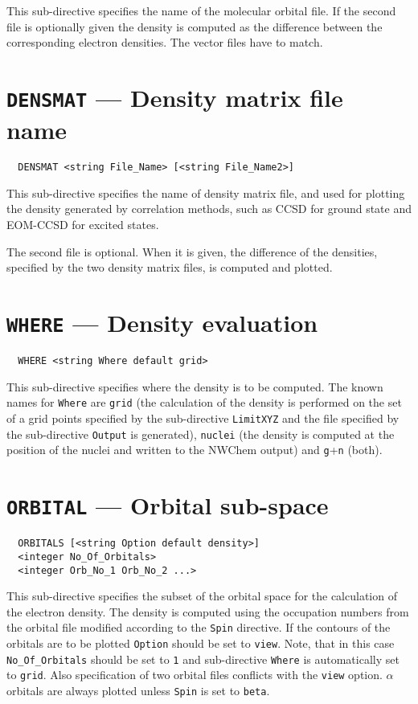 This sub-directive specifies the name of the molecular orbital file.
If the second file is optionally given the density is computed as the
difference between the corresponding electron densities. The vector 
files have to match.

\section{{\tt DENSMAT} ---  Density matrix file name}

\begin{verbatim}
  DENSMAT <string File_Name> [<string File_Name2>]
\end{verbatim}

This sub-directive specifies the name of density matrix file,
and used for plotting the density generated by correlation methods,
such as CCSD for ground state and EOM-CCSD for excited states.

The second file is optional. When it is given, 
the difference of the densities, specified by the two density matrix files,
is computed and plotted.

\section{{\tt WHERE} --- Density evaluation}

\begin{verbatim}
  WHERE <string Where default grid>
\end{verbatim}

This sub-directive specifies where the density is to be computed.
The known names for \verb+Where+ are \verb+grid+ (the calculation of
the density is performed on the set of a grid points specified by the
sub-directive \verb+LimitXYZ+ and the file specified by the sub-directive
\verb+Output+ is generated), \verb+nuclei+ (the density is computed at
the position of the nuclei and written to the NWChem output) and
\verb+g++\verb+n+ (both).


\section{{\tt ORBITAL} --- Orbital sub-space}

\begin{verbatim}
  ORBITALS [<string Option default density>]
  <integer No_Of_Orbitals>
  <integer Orb_No_1 Orb_No_2 ...>
\end{verbatim}

This sub-directive specifies the subset of the orbital space for the
calculation of the electron density. The density is computed using the
occupation numbers from the orbital file modified according to the
\verb+Spin+ directive. If the contours of the orbitals are to be plotted
\verb+Option+ should be set to \verb+view+. Note, that in this case
\verb+No_Of_Orbitals+ should be set to \verb+1+ and sub-directive
\verb+Where+ is automatically set to \verb+grid+. Also specification
of two orbital files conflicts with the \verb+view+ option.
$\alpha$ orbitals are always plotted unless \verb+Spin+ is set to
\verb+beta+.

